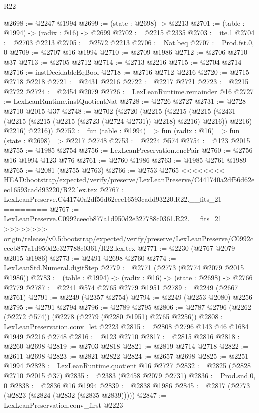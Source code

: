 \begin{lexlean}{R22}
\begin{coremodule}
{{{{{{{{{{{{{{{{{{{{{{{{{{{{{{{{{{{{{{{{{{{{{{{{{{{{@2698 := @2247 @1994
@2699 := (state : @2698) -> @2213
@2701 := (table : @1994) -> (radix : @16) -> @2699
@2702 := @2215 @2335
@2703 := ite.{1}
@2704 := @2703 @2213
@2705 := @2572 @2213
@2706 := Nat.beq
@2707 := Prod.fst.{0, 0}
@2709 := @2707 @16 @1994
@2710 := @2709 @1986
@2712 := @2706 @2710 @37
@2713 := @2705 @2712
@2714 := @2713 @2216
@2715 := @2704 @2714
@2716 := instDecidableEqBool
@2718 := @2716 @2712 @2216
@2720 := @2715 @2718 @2218
@2721 := @2431 @2216
@2722 := @2217 @2721
@2723 := @2215 @2722
@2724 := @2454 @2079
@2726 := LexLeanRuntime.remainder @16
@2727 := LexLeanRuntime.instQuotientNat
@2728 := @2726 @2727
@2731 := @2728 @2710 @2015 @37
@2748 := @2702
    (@2720
      (@2215
        (@2215
          (@2215 (@2431 (@2215 (@2215 (@2215 (@2723 (@2724 @2731)) @2218) @2216) @2216)) @2216)
          @2216)
        @2216))
@2752 := fun (table : @1994) => fun (radix : @16) => fun (state : @2698) => @2217 @2748
@2753 := @2224 @574
@2754 := @123 @2015
@2755 := @1985 @2754
@2756 := LexLeanPreservation.encPair
@2760 := @2756 @16 @1994 @123 @776
@2761 := @2760 @1986
@2763 := @1985 @2761 @1989
@2765 := @2081 (@2755 @2763)
@2766 := @2753 @2765
<<<<<<<< HEAD:bootstrap/expected/verify/preserve/LexLeanPreserve/C441740a2df56d62eec16593cadd93220/R22.lex.tex
@2767 := LexLeanPreserve.C441740a2df56d62eec16593cadd93220.R22.__fits_21
========
@2767 := LexLeanPreserve.C0992ceecb877a1d950d2e327788c0361.R22.__fits_21
>>>>>>>> origin/release/v0.5:bootstrap/expected/verify/preserve/LexLeanPreserve/C0992ceecb877a1d950d2e327788c0361/R22.lex.tex
@2771 := @2230 (@2767 @2079 @2015 @1986)
@2773 := @2491 @2698 @2760
@2774 := LexLeanStd.Numeral.digitStep
@2779 := @2771 (@2773 (@2774 @2079 @2015 @1986))
@2783 := (table : @1994) -> (radix : @16) -> (state : @2698) -> @2766 @2779
@2787 := @2241 @574 @2765 @2779 @1951
@2789 := @2249 (@2667 @2761)
@2791 := @2249 (@2357 @2754)
@2794 := @2249 (@2253 @2080) @2256
@2795 := @2791 @2794
@2796 := @2789 @2795
@2806 := @2787 @2796 (@2262 (@2272 @574)) (@2278 (@2279 (@2280 @1951) @2765 @2256))
@2808 := LexLeanPreservation.conv_let @2223
@2815 := @2808 @2796 @143 @46 @1684 @1949 @2216 @2748
@2816 := @123 @2710
@2817 := @2815 @2816
@2818 := @2260 @2698
@2819 := @2703 @2818
@2821 := @2819 @2714 @2718
@2822 := @2611 @2698
@2823 := @2821 @2822
@2824 := @2657 @2698
@2825 := @2251 @1994
@2828 := LexLeanRuntime.quotient @16 @2727
@2832 := @2825 (@2828 @2710 @2015 @37)
@2835 := @2383 (@2458 @2079 @2731)
@2836 := Prod.snd.{0, 0}
@2838 := @2836 @16 @1994
@2839 := @2838 @1986
@2845 := @2817 (@2773 (@2823 (@2824 (@2832 (@2835 @2839)))))
@2847 := LexLeanPreservation.conv_first @2223
}}}}}}}}}}}}}}}}}}}}}}}}}}}}}}}}}}}}}}}}}}}}}}}}}}}}
\end{coremodule}
\end{lexlean}
